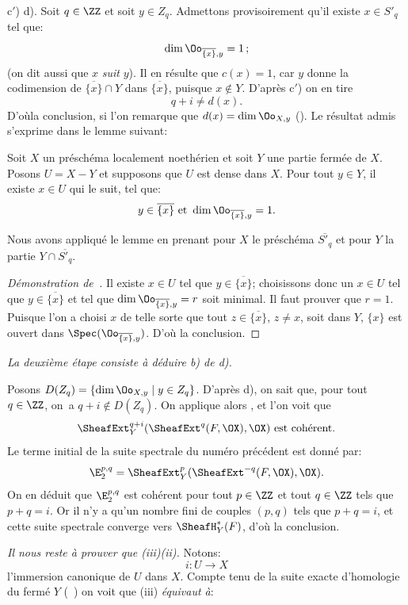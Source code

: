 c$'$) \ALORS d). Soit $q\in\ZZ$ et soit $y\in Z_q$. Admettons provisoirement qu'il existe $x\in S'_q$ tel que:
\[
\dim \Oo_{\overline{\{x\}}, y}=1\, \text{;}\]
(on dit aussi que $x$ \emph{suit} $y$). Il en r\'esulte que $c(x)=1$, car $y$ \og donne la codimension de $\overline{\{x\}}\cap Y$ dans $\overline{\{x\}}$\fg, puisque $x\not\in Y$. D'apr\`es c$'$) on en tire
\[q+i\neq d(x).
\]
D'o\`u\pageoriginale la conclusion, si l'on remarque que $d(x)=\dim \Oo_{X, y}$ (). Le r\'esultat admis s'exprime dans le lemme suivant:

\begin{lemme} \label{VIII.2.5} Soit $X$ un pr\'esch\'ema localement noeth\'erien et soit $Y$ une partie ferm\'ee de $X$. Posons $U=X-Y$ et supposons que $U$ est dense dans $X$. Pour tout $y\in Y$, il existe $x\in U$ \og qui le suit\fg, \ie tel que:
\[y\in\overline{\{x\}}\text{ et } \dim\Oo_{\overline{\{x\}}, y}=1.
\]
\end{lemme}

Nous avons appliqu\'e le lemme en prenant pour $X$ le pr\'esch\'ema $\overline{S'_q}$ et pour $Y$ la partie $Y\cap \overline{S'_q}$.

\begin{proof}[D\'emonstration de~]
Il existe $x\in U$ tel que $y\in\overline{\{x\}}$; choisissons donc un $x\in U$ tel que $y\in\overline{\{x\}}$ et tel que $\dim \Oo_{\overline{\{x\}}, y}=r$ soit minimal. Il faut prouver que $r=1$. Puisque l'on a choisi $x$ de telle sorte que tout $z\in\overline{\{x\}}$, $z\neq x$, soit dans $Y$, $\{x\}$ est ouvert dans $\Spec(\Oo_{\overline{\{x\}}, y})$. D'o\`u la conclusion.
\skipqed
\end{proof}

\emph{La deuxi\`eme \'etape consiste \`a d\'eduire \textup{b)} de \textup{d)}.}

\noindent Posons $D(Z_q)=\{\dim \Oo_{X, y} \mid y\in Z_q\}$. D'apr\`es d), on sait que, pour tout $q\in\ZZ$, on~a $q+i\not\in D(Z_q)$. On applique alors , et l'on voit que
\[
\SheafExt^{q+i}_Y(\SheafExt^q(F, \OX), \OX) \text{ est coh\'erent.}\]
Le terme initial de la suite spectrale du num\'ero pr\'ec\'edent est donn\'e par:
\[
\E^{p, q}_2=\SheafExt^p_Y(\SheafExt^{-q}(F, \OX), \OX).
\]
On en d\'eduit que $\E^{p, q}_2$ est coh\'erent pour tout $p\in\ZZ$ et tout $q\in\ZZ$ tels que $p+q=i$. Or il n'y a qu'un nombre fini de couples $(p, q)$ tels que $p+q=i$, et cette suite spectrale converge vers $\SheafH^\ast_Y(F)$, d'o\`u la conclusion.

\emph{Il nous reste \`a prouver que \textup{(iii)}\ALORS\textup{(ii)}.} Notons:
\[i\colon U\to X\]
l'immersion canonique de $U$ dans $X$. Compte tenu de la suite exacte d'homologie du ferm\'e $Y$ (~) on voit que (iii) \emph{\'equivaut \`a}:

